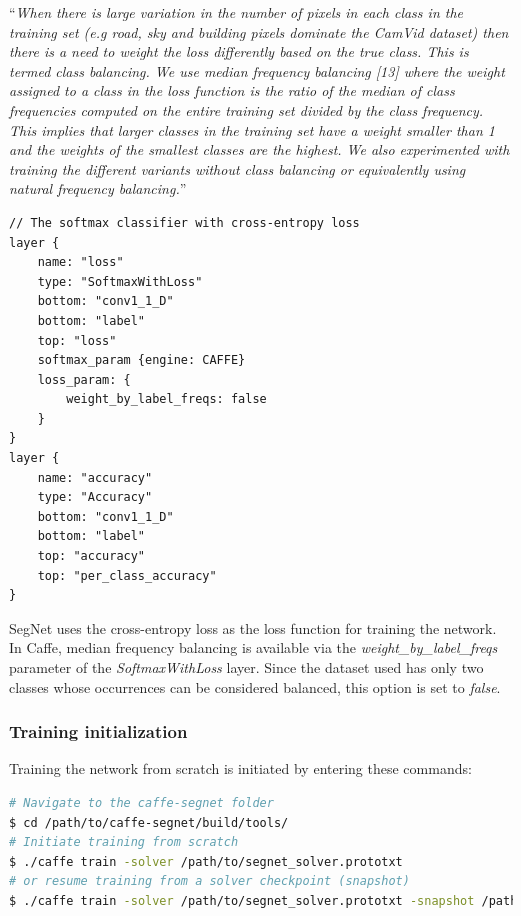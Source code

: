 \enquote{\textit{When there is large variation in the number of
	pixels in each class in the training set (e.g road, sky and building
	pixels dominate the CamVid dataset) then there is a need to weight
	the loss differently based on the true class. This is termed class
	balancing. We use median frequency balancing [13] where the
	weight assigned to a class in the loss function is the ratio of the
	median of class frequencies computed on the entire training set
	divided by the class frequency. This implies that larger classes in
	the training set have a weight smaller than 1 and the weights
	of the smallest classes are the highest. We also experimented
	with training the different variants without class balancing or
	equivalently using natural frequency balancing.}} \cite{segnet}

\begin{lstlisting}[caption={Output layers of \textit{train.prototxt} \cite{filip_github}},captionpos=b]
// The softmax classifier with cross-entropy loss
layer {
	name: "loss"
	type: "SoftmaxWithLoss"
	bottom: "conv1_1_D"
	bottom: "label"
	top: "loss"
	softmax_param {engine: CAFFE}
	loss_param: {
		weight_by_label_freqs: false	     
	}
}
layer {
	name: "accuracy"
	type: "Accuracy"
	bottom: "conv1_1_D"
	bottom: "label"
	top: "accuracy"
	top: "per_class_accuracy"
}
\end{lstlisting}


SegNet uses the cross-entropy loss as the loss function for training the network. In Caffe, median frequency balancing is available via the \textit{weight\_by\_label\_freqs} parameter of the \textit{SoftmaxWithLoss} layer. Since the dataset used has only two classes whose occurrences can be considered balanced, this option is set to \textit{false}. 

\subsubsection{Training initialization}

\noindent Training the network from scratch is initiated by entering these commands:

\begin{lstlisting}[language=bash]
# Navigate to the caffe-segnet folder
$ cd /path/to/caffe-segnet/build/tools/
# Initiate training from scratch
$ ./caffe train -solver /path/to/segnet_solver.prototxt
# or resume training from a solver checkpoint (snapshot)
$ ./caffe train -solver /path/to/segnet_solver.prototxt -snapshot /path/to/snapshot_iter_XY.solverstate
\end{lstlisting}

